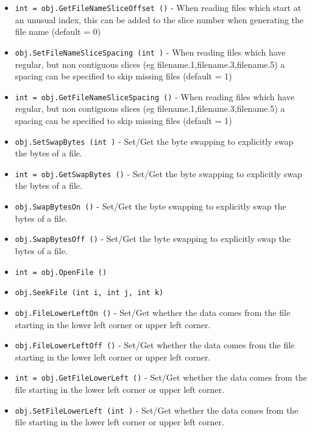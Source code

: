 \begin{itemize}
\item  \verb|int = obj.GetFileNameSliceOffset ()| -  When reading files which start at an unusual index, this can be added
 to the slice number when generating the file name (default = 0)

\item  \verb|obj.SetFileNameSliceSpacing (int )| -  When reading files which have regular, but non contiguous slices
 (eg filename.1,filename.3,filename.5)
 a spacing can be specified to skip missing files (default = 1)

\item  \verb|int = obj.GetFileNameSliceSpacing ()| -  When reading files which have regular, but non contiguous slices
 (eg filename.1,filename.3,filename.5)
 a spacing can be specified to skip missing files (default = 1)

\item  \verb|obj.SetSwapBytes (int )| -  Set/Get the byte swapping to explicitly swap the bytes of a file.

\item  \verb|int = obj.GetSwapBytes ()| -  Set/Get the byte swapping to explicitly swap the bytes of a file.

\item  \verb|obj.SwapBytesOn ()| -  Set/Get the byte swapping to explicitly swap the bytes of a file.

\item  \verb|obj.SwapBytesOff ()| -  Set/Get the byte swapping to explicitly swap the bytes of a file.

\item  \verb|int = obj.OpenFile ()|

\item  \verb|obj.SeekFile (int i, int j, int k)|

\item  \verb|obj.FileLowerLeftOn ()| -  Set/Get whether the data comes from the file starting in the lower left
 corner or upper left corner.

\item  \verb|obj.FileLowerLeftOff ()| -  Set/Get whether the data comes from the file starting in the lower left
 corner or upper left corner.

\item  \verb|int = obj.GetFileLowerLeft ()| -  Set/Get whether the data comes from the file starting in the lower left
 corner or upper left corner.

\item  \verb|obj.SetFileLowerLeft (int )| -  Set/Get whether the data comes from the file starting in the lower left
 corner or upper left corner.


\end{itemize}
